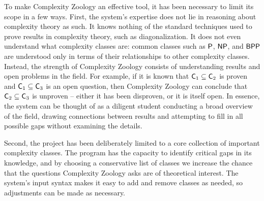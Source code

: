 To make Complexity Zoology an effective tool, it has been necessary to limit its
scope in a few ways. First, the system's expertise does not lie in reasoning 
about complexity theory as such. It knows nothing of the standard techniques 
used to prove results in complexity theory, such as diagonalization. It does not
even understand what complexity classes are: common classes such as $\mathsf{P}$, 
$\mathsf{NP}$, and $\mathsf{BPP}$ are understood only in terms of their relationships to 
other complexity classes. Instead, the strength of Complexity Zoology consists 
of understanding results and open problems in the field. For example, if it is 
known that $\mathsf{C}_1\subseteq\mathsf{C}_2$ is proven and $\mathsf{C}_1\subseteq\mathsf{C}_3$ is an open 
question, then Complexity Zoology can conclude that $\mathsf{C}_2\subseteq\mathsf{C}_3$ is 
unproven -- either it has been disproven, or it is itself open. In essence, the 
system can be thought of as a diligent student conducting a broad overview of 
the field, drawing connections between results and attempting to fill in all 
possible gaps without examining the details.

Second, the project has been deliberately limited to a core collection of
important complexity classes. The program has the capacity to identify critical
gaps in its knowledge, and by choosing a conservative list of classes we
increase the chance that the questions Complexity Zoology asks are of
theoretical interest. The system's input syntax makes it easy to add and remove
classes as needed, so adjustments can be made as necessary.
